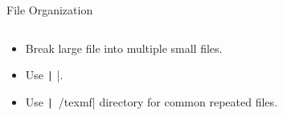 \documentclass[aspectratio=169]{beamer}
\newcommand{\code}[2][python]{\texttt|#2|}
\begin{document}
\begin{frame}{File Organization}
    \begin{columns}
        \begin{column}{0.39\textwidth}
            \begin{itemize}
                \item<1-> Break large file into multiple small files.
                \item<1-> Use \texttt| |.
                \item<2-> Use \code{~/texmf} directory for common repeated files.
            \end{itemize}
        \end{column}
        \begin{column}{0.59\textwidth}
            \begin{columns}
                \begin{column}{0.49\textwidth}
                \end{column}
                \begin{column}{0.49\textwidth}
                \end{column}
            \end{columns}
        \end{column}
    \end{columns}
\end{frame} 
%
%
%
%
\end{document}
